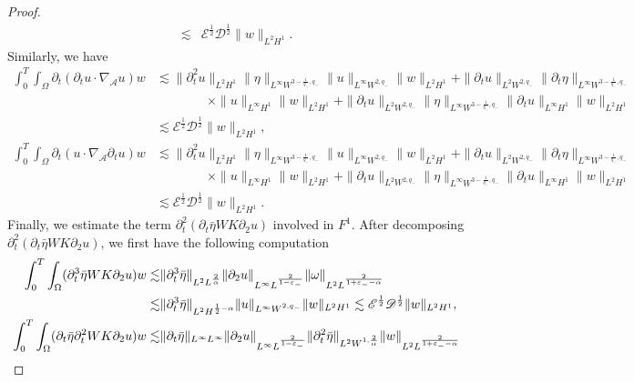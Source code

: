 \documentclass[letterpaper,reqno,10pt,twoside]{amsart}
\theoremstyle{definition}
\theoremstyle{remark}
\def\p{\partial}
\begin{document}
\begin{proof}
\[\begin{aligned}
				\lesssim&  \mathscr{E}^{\frac{1}{2}}\mathscr{D}^{\frac{1}{2}}\|w\|_{L^{2}H^{1}}.
			\end{aligned}\]
			\noindent Similarly, we have
			\[\begin{aligned}
				\int_{0}^{T}\int_{\Omega}\p_{t}(\p_{t}u\cdot \nabla_\mathcal{A}u)w
				&\lesssim\|\p_{t}^{2}u\|_{L^{2}H^{1}}\|{\eta}\|_{L^{\infty}W^{3-\frac{1}{q_{-}},q_{-}}}\|u\|_{L^{\infty}W^{2,q_{-}}}\|w\|_{L^{2}H^{1}}+\|\p_{t}u\|_{L^{2}W^{2,q_{-}}}\|\p_{t}{\eta}\|_{L^{\infty}W^{3-\frac{1}{q_{-}},q_{-}}}\\
				&\qquad\qquad\times \|u\|_{L^{\infty}H^{1}}\|w\|_{L^{2}H^{1}}
				+\|\p_{t}u\|_{L^{2}W^{2,q_{-}}}\|{\eta}\|_{L^{\infty}W^{3-\frac{1}{q_{-}},q_{-}}}\|\p_{t}u\|_{L^{\infty}H^{1}}\|w\|_{L^{2}H^{1}}\\
				&\lesssim  \mathscr{E}^{\frac{1}{2}}\mathscr{D}^{\frac{1}{2}}\|w\|_{L^{2}H^{1}},
			\end{aligned}\]
			\[\begin{aligned}
				\int_{0}^{T}\int_{\Omega}\p_{t}(u\cdot \nabla_\mathcal{A}\p_{t}u)w
				& \lesssim\|\p_{t}^{2}u\|_{L^{2}H^{1}}\|{\eta}\|_{L^{\infty}W^{3-\frac{1}{q_{-}},q_{-}}}\|u\|_{L^{\infty}W^{2,q_{-}}}\|w\|_{L^{2}H^{1}}+\|\p_{t}u\|_{L^{2}W^{2,q_{-}}}\|\p_{t}{\eta}\|_{L^{\infty}W^{3-\frac{1}{q_{-}},q_{-}}}\\
				&\qquad\qquad\times\|u\|_{L^{\infty}H^{1}}\|w\|_{L^{2}H^{1}}+\|\p_{t}u\|_{L^{2}W^{2,q_{-}}}\|{\eta}\|_{L^{\infty}W^{3-\frac{1}{q_{-}},q_{-}}}\|\p_{t}u\|_{L^{\infty}H^{1}}\|w\|_{L^{2}H^{1}} \\
				&\lesssim  \mathscr{E}^{\frac{1}{2}}\mathscr{D}^{\frac{1}{2}}\|w\|_{L^{2}H^{1}}.
			\end{aligned}\]
			Finally, we estimate the term $\partial_{t}^{2}(\p_{t}\bar{\eta}WK\p_{2}u)$ involved in $F^{1}$. After decomposing $\partial_{t}^{2}(\p_{t}\bar{\eta}WK\p_{2}u)$, we first have the following computation
			\begin{align}{\label{eq:f_5}}
				\begin{aligned}
					\int_{0}^{T}\int_{\Omega}(\p_{t}^{3}\bar{\eta}WK\p_{2}u)w\lesssim&\|\p_{t}^3\bar{\eta}\|_{L^{2}L^{\frac{2}{\alpha}}}\|\p_{2}u\|_{L^{\infty}L^{\frac{2}{1-\varepsilon_{-}}}}\|\omega\|_{L^{2}L^{\frac{2}{1+\varepsilon_{-}-\alpha}}}\\
					\lesssim &\|\p_{t}^{3}\bar{\eta}\|_{L^{2}H^{\frac{1}{2}-\alpha}}\|u\|_{L^{\infty}W^{2,q_{-}}}\|w\|_{L^{2}H^{1}}\lesssim \mathscr{E}^{\frac{1}{2}}\mathscr{D}^{\frac{1}{2}}\|w\|_{L^{2}H^{1}},\\
					\int_{0}^{T}\int_{\Omega}(\p_{t}\bar{\eta}\p_{t}^{2}WK\p_{2}u)w\lesssim&\|\p_{t}\bar{\eta}\|_{L^{\infty}L^{\infty}}\|\p_{2}u\|_{L^{\infty}L^{\frac{2}{1-\varepsilon_{-}}}}\|\p_{t}^{2}\bar{\eta}\|_{L^{2}W^{1,\frac{2}{\alpha}}}\|w\|_{L^{2}L^{\frac{2}{1+\varepsilon_{-}-\alpha}}}\\

\end{aligned}
\end{align}
\end{proof}
\end{document}
